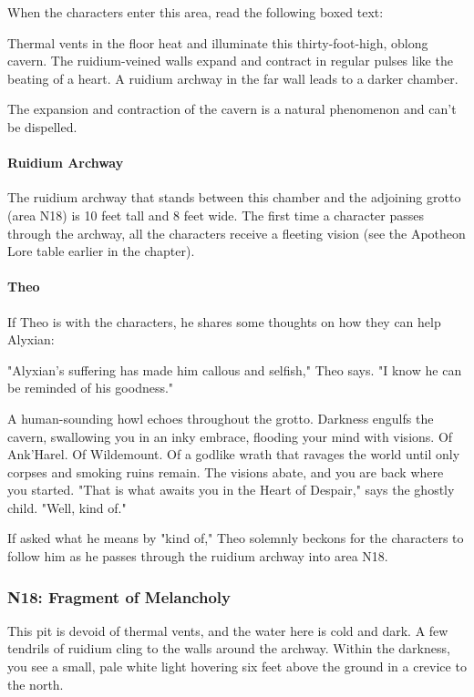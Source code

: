 \documentclass[10pt,a4paper,twoside,bg=print,twocolumn,openany,nodeprecatedcode]{dndbook}
\begin{document}
When the characters enter this area, read the following boxed text:

\begin{DndReadAloud}{}
Thermal vents in the floor heat and illuminate this thirty-foot-high, oblong cavern. The ruidium-veined walls expand and contract in regular pulses like the beating of a heart. A ruidium archway in the far wall leads to a darker chamber.

\end{DndReadAloud}

The expansion and contraction of the cavern is a natural phenomenon and can't be dispelled.

\paragraph{Ruidium Archway}
The ruidium archway that stands between this chamber and the adjoining grotto (area N18) is 10 feet tall and 8 feet wide. The first time a character passes through the archway, all the characters receive a fleeting vision (see the Apotheon Lore table earlier in the chapter).

\paragraph{Theo}
If Theo is with the characters, he shares some thoughts on how they can help Alyxian:

\begin{DndReadAloud}{}
"Alyxian's suffering has made him callous and selfish," Theo says. "I know he can be reminded of his goodness."

A human-sounding howl echoes throughout the grotto. Darkness engulfs the cavern, swallowing you in an inky embrace, flooding your mind with visions. Of Ank'Harel. Of Wildemount. Of a godlike wrath that ravages the world until only corpses and smoking ruins remain. The visions abate, and you are back where you started. "That is what awaits you in the Heart of Despair," says the ghostly child. "Well, kind of."

\end{DndReadAloud}

If asked what he means by "kind of," Theo solemnly beckons for the characters to follow him as he passes through the ruidium archway into area N18.



\subsubsection{N18: Fragment of Melancholy}
\begin{DndReadAloud}{}
This pit is devoid of thermal vents, and the water here is cold and dark. A few tendrils of ruidium cling to the walls around the archway. Within the darkness, you see a small, pale white light hovering six feet above the ground in a crevice to the north.

\end{DndReadAloud}
\end{document}

